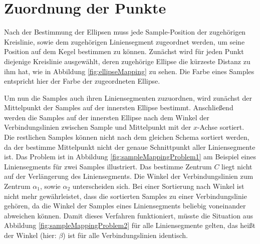 \section{Zuordnung der Punkte}
\label{s:pointMapping}
Nach der Bestimmung der Ellipsen muss jede Sample-Position der zugehörigen Kreislinie, sowie dem zugehörigen Liniensegment zugeordnet werden, um seine Position auf dem Kegel bestimmen zu können.
Zunächst wird für jeden Punkt diejenige Kreislinie ausgewählt, deren zugehörige Ellipse die kürzeste Distanz zu ihm hat, wie in Abbildung \ref{fig:ellipseMapping} zu sehen. Die Farbe eines Samples entspricht hier der Farbe der zugeordneten Ellipse.

Um nun die Samples auch ihren Liniensegmenten zuzuordnen, wird zunächst der Mittelpunkt der Samples auf der innersten Ellipse bestimmt. Anschließend werden die Samples auf der innersten Ellipse nach dem Winkel der Verbindungslinien zwischen Sample und Mittelpunkt mit der $x$-Achse sortiert.
Die restlichen Samples können nicht nach dem gleichen Schema sortiert werden, da der bestimme Mittelpunkt nicht der genaue Schnittpunkt aller Liniensegmente ist.
Das Problem ist in Abbildung \ref{fig:sampleMappingProblem1} am Beispiel eines Liniensegments für zwei Samples illustriert. Das bestimme Zentrum $C$ liegt nicht auf der Verlängerung des Liniensegments.  Die Winkel der Verbindungslinien zum Zentrum $\alpha_1$, sowie $\alpha_2$ unterscheiden sich. Bei einer Sortierung nach Winkel ist nicht mehr gewährleistet, dass die sortierten Samples zu einer Verbindungslinie gehören, da die Winkel der Samples eines Liniensegments beliebig voneinander abweichen können.  Damit dieses Verfahren funktioniert, müsste die Situation aus Abbildung \ref{fig:sampleMappingProblem2} für alle Liniensegmente gelten, das heißt der Winkel (hier: $\beta$) ist für alle Verbindungslinien identisch.

